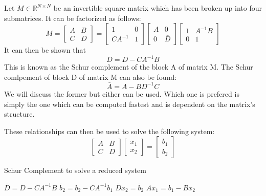 \documentclass[peerreview,compsoc,onecolumn]{IEEEtran}
\newcommand{\R}{\mathbb{R}}
\begin{document}
Let $M \in \R^{N \times N}$ be an invertible square matrix which has been broken up into four submatrices. It can be factorized as follows:
\begin{equation}
M = \begin{bmatrix}
A & B \\
C & D
\end{bmatrix}
=
\begin{bmatrix}
1 & 0 \\
C A^{-1} & 1
\end{bmatrix}
\begin{bmatrix}
A & 0 \\
0 & \bar{D}
\end{bmatrix}
\begin{bmatrix}
1 & A^{-1}B \\
0 & 1
\end{bmatrix}
\end{equation}
It can then be shown that
\begin{equation}
\bar{D} = D - C A^{-1}B
\end{equation}
This is known as the Schur complement of the block A of matrix M. The Schur comlpement of block D of matrix M can also be found:
\begin{equation}
\bar{A} = A - B D^{-1}C
\end{equation}
We will discuss the former but either can be used. Which one is prefered is simply the one which can be computed fastest and is dependent on the matrix's structure.

These relationships can then be used to solve the following system:
\begin{equation}
\begin{bmatrix}
A & B \\
C & D
\end{bmatrix}
\begin{bmatrix}
x_1 \\ x_2
\end{bmatrix}
=
\begin{bmatrix}
b_1 \\ b_2
\end{bmatrix}
\end{equation}

\begin{algorithm}{}
\caption{\label{alg:schur_complement}Schur Complement to solve a reduced system}
\begin{algorithmic}[1]
	\State $\bar{D} = D - C A^{-1} B$
	\State $\bar{b}_2 = b_2 - C A^{-1} b_1$  
	\State $\bar{D} x_2 = \bar{b}_2$         
	\State $A x_1 = b_1 - B x_2$
\end{algorithmic}
\end{algorithm}
\end{document}
